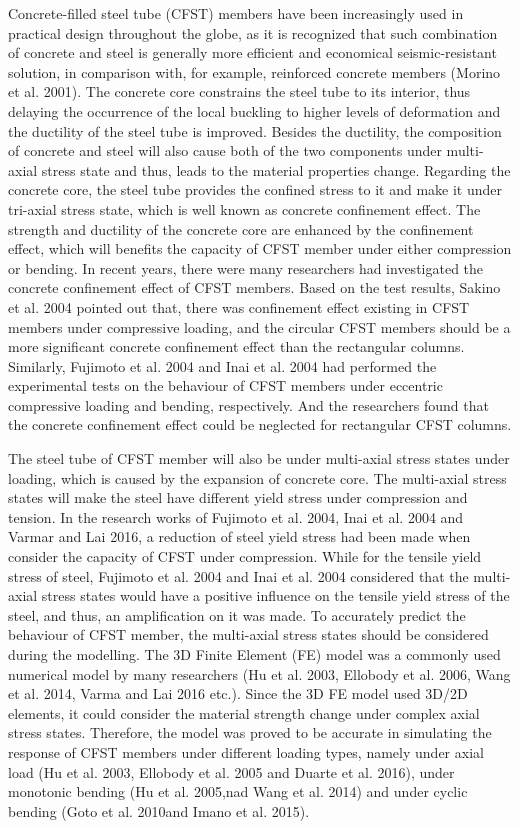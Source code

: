 Concrete-filled steel tube (CFST) members have been increasingly used in practical design throughout the globe, as it is recognized that such combination of concrete and steel is generally more efficient and economical seismic-resistant solution, in comparison with, for example, reinforced concrete members (Morino et al. 2001). The concrete core constrains the steel tube to its interior, thus delaying the occurrence of the local buckling to higher levels of deformation and the ductility of the steel tube is improved. Besides the ductility, the composition of concrete and steel will also cause both of the two components under multi-axial stress state and thus, leads to the material properties change. Regarding the concrete core, the steel tube provides the confined stress to it and make it under tri-axial stress state, which is well known as concrete confinement effect. The strength and ductility of the concrete core are enhanced by the confinement effect, which will benefits the capacity of CFST member under either compression or bending. In recent years, there were many researchers had investigated the concrete confinement effect of CFST members. Based on the test results, Sakino et al. 2004 pointed out that, there was confinement effect existing in CFST members under compressive loading, and the circular CFST members should be a more significant concrete confinement effect than the rectangular columns. Similarly, Fujimoto et al. 2004 and Inai et al. 2004 had performed the experimental tests on the behaviour of CFST members under eccentric compressive loading and bending, respectively. And the researchers found that the concrete confinement effect could be neglected for rectangular CFST columns.

The steel tube of CFST member will also be under multi-axial stress states under loading, which is caused by the expansion of concrete core. The multi-axial stress states will make the steel have different yield stress under compression and tension. In the research works of Fujimoto et al. 2004, Inai et al. 2004 and Varmar and Lai 2016, a reduction of steel yield stress had been made when consider the capacity of CFST under compression. While for the tensile yield stress of steel, Fujimoto et al. 2004 and Inai et al. 2004 considered that the multi-axial stress states would have a positive influence on the tensile yield stress of the steel, and thus, an amplification on it was made.
To accurately predict the behaviour of CFST member, the multi-axial stress states should be considered during the modelling. The 3D Finite Element (FE) model was a commonly used numerical model by many researchers (Hu et al. 2003, Ellobody et al. 2006, Wang et al. 2014, Varma and Lai 2016 etc.). Since the 3D FE model used 3D/2D elements, it could consider the material strength change under complex axial stress states. Therefore, the model was proved to be accurate in simulating the response of CFST members under different loading types, namely under axial load (Hu et al. 2003, Ellobody et al. 2005 and Duarte et al. 2016), under monotonic bending (Hu et al. 2005,nad Wang et al. 2014) and under cyclic bending (Goto et al. 2010and Imano et al. 2015). 

